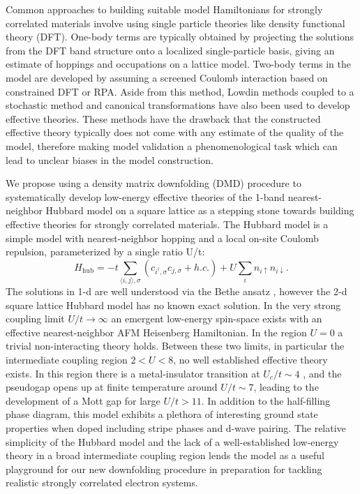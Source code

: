 \documentclass[12pt]{article}
\begin{document}
Common approaches to building suitable model Hamiltonians for strongly correlated materials involve using single particle theories like density functional theory (DFT).
One-body terms are typically obtained by projecting the solutions from the DFT band structure onto a localized single-particle basis, giving an estimate of hoppings and occupations on a lattice model.
Two-body terms in the model are developed by assuming a screened Coulomb interaction based on constrained DFT or RPA.
Aside from this method, Lowdin methods coupled to a stochastic method and canonical transformations have also been used to develop effective theories.
These methods have the drawback that the constructed effective theory typically does not come with any estimate of the quality of the model, therefore making model validation a phenomenological task which can lead to unclear biases in the model construction.

We propose using a density matrix downfolding (DMD) procedure to systematically develop low-energy effective theories of the 1-band nearest-neighbor Hubbard model on a square lattice as a stepping stone towards building effective theories for strongly correlated materials. The Hubbard model is a simple model with nearest-neighbor hopping and a local on-site Coulomb repulsion, parameterized by a single ratio U/t: 
\begin{equation}
H_\text{hub} = -t \sum_{\langle i,j \rangle,\sigma}( c_{i^\dagger,\sigma} c_{j,\sigma} + h.c.) + U \sum_i n_{i\uparrow} n_{i\downarrow}
\label{hubbard}.
\end{equation}
The solutions in 1-d are well understood via the Bethe ansatz , however the 2-d square lattice Hubbard model has no known exact solution.  In the very strong coupling limit $U/t \rightarrow \infty$ an emergent low-energy spin-space exists with an effective nearest-neighbor AFM Heisenberg Hamiltonian. In the region $U = 0$ a trivial non-interacting theory holds. Between these two limits, in particular the intermediate coupling region $2 < U < 8$, no well established effective theory exists. In this region there is a metal-insulator transition at $U_c/t \sim 4$ , and the pseudogap opens up at finite temperature around $U/t \sim 7$, leading to the development of a Mott gap for large $U/t > 11$. In addition to the half-filling phase diagram, this model exhibits a plethora of interesting ground state properties when doped including stripe phases and d-wave pairing. The relative simplicity of the Hubbard model and the lack of a well-established low-energy theory in a broad intermediate coupling region lends the model as a useful playground for our new downfolding procedure in preparation for tackling realistic strongly correlated electron systems. 
\end{document}
